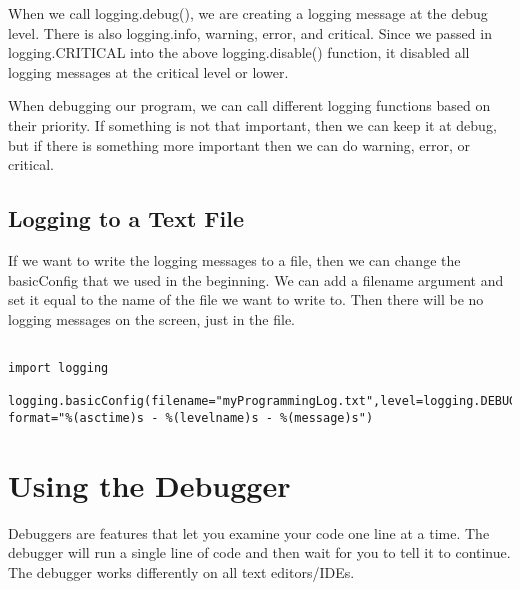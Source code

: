 \documentclass[11pt]{article}
\begin{document}
When we call logging.debug(), we are creating a logging message at the debug level. There is also logging.info, warning, error, and critical. Since we passed in logging.CRITICAL into the above logging.disable() function, it disabled all logging messages at the critical level or lower.

When debugging our program, we can call different logging functions based on their priority. If something is not that important, then we can keep it at debug, but if there is something more important then we can do warning, error, or critical.

\subsection{Logging to a Text File}
\label{sec:orgddce001}

If we want to write the logging messages to a file, then we can change the basicConfig that we used in the beginning. We can add a filename argument and set it equal to the name of the file we want to write to. Then there will be no logging messages on the screen, just in the file.

\begin{verbatim}

import logging

logging.basicConfig(filename="myProgrammingLog.txt",level=logging.DEBUG, format="%(asctime)s - %(levelname)s - %(message)s")

\end{verbatim}

\section{Using the Debugger}
\label{sec:org67a656d}

Debuggers are features that let you examine your code one line at a time. The debugger will run a single line of code and then wait for you to tell it to continue. The debugger works differently on all text editors/IDEs.
\end{document}
